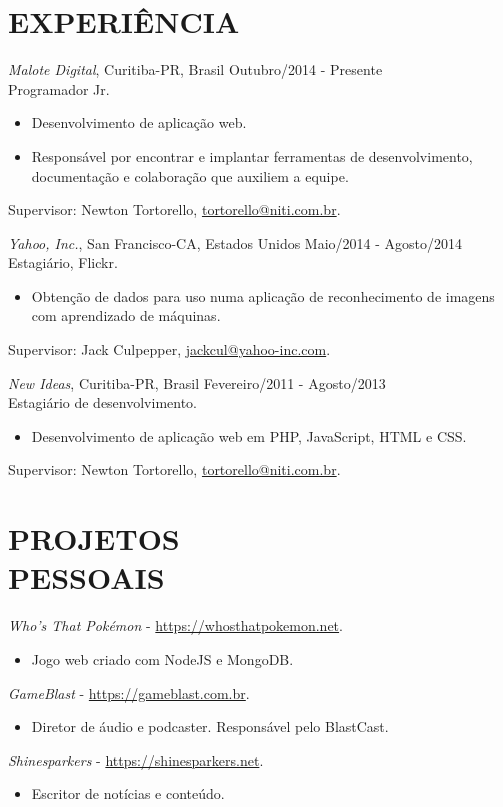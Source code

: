 \documentclass[margin]{res}
\begin{document}
\begin{resume}
 		\section{EXPERIÊNCIA}
			{\sl Malote Digital}, Curitiba-PR, Brasil \hfill Outubro/2014 - Presente \\
			Programador Jr.
			\begin{itemize}
				\itemsep -2pt
		    	\item Desenvolvimento de aplicação web.
				\item Responsável por encontrar e implantar ferramentas de desenvolvimento, documentação e colaboração que auxiliem a equipe.
			\end{itemize}
			Supervisor: Newton Tortorello, \href{mailto:tortorello@niti.com.br}{tortorello@niti.com.br}.
			
			{\sl Yahoo, Inc.}, San Francisco-CA, Estados Unidos \hfill Maio/2014 - Agosto/2014 \\
			Estagiário, Flickr.
			\begin{itemize}
				\itemsep -2pt
		    	\item Obtenção de dados para uso numa aplicação de reconhecimento de imagens com aprendizado de máquinas.
			\end{itemize}
			Supervisor: Jack Culpepper, \href{mailto:jackcul@yahoo-inc.com}{jackcul@yahoo-inc.com}.

			{\sl New Ideas}, Curitiba-PR, Brasil \hfill Fevereiro/2011 - Agosto/2013 \\
			Estagiário de desenvolvimento.
			\begin{itemize}
				\itemsep -2pt
		    	\item Desenvolvimento de aplicação web em PHP, JavaScript, HTML e CSS.
			\end{itemize}
			Supervisor: Newton Tortorello, \href{mailto:tortorello@niti.com.br}{tortorello@niti.com.br}.
			
		\section{PROJETOS \\ PESSOAIS}
			{\sl Who's That Pokémon} - \href{https://whosthatpokemon.net}{https://whosthatpokemon.net}.
			\begin{itemize}
				\item[] Jogo web criado com NodeJS e MongoDB.
			\end{itemize}
			{\sl GameBlast} - \href{https://gameblast.com.br}{https://gameblast.com.br}.
			\begin{itemize}
				\item[] Diretor de áudio e podcaster. Responsável pelo BlastCast.
			\end{itemize}
			{\sl Shinesparkers} - \href{https://shinesparkers.net}{https://shinesparkers.net}.
			\begin{itemize}
				\item[] Escritor de notícias e conteúdo.
			\end{itemize}
	

\end{resume}
\end{document}

